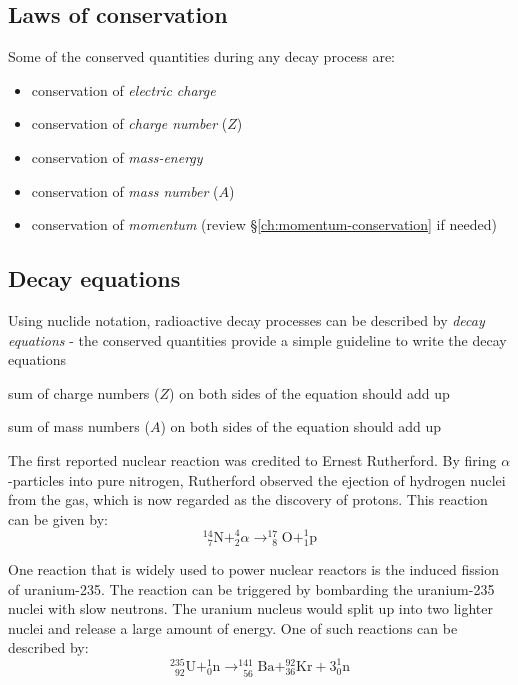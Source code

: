 \documentclass[a4paper,12pt]{book}
\begin{document}
\subsection{Laws of conservation}

Some of the conserved quantities during any decay process are:
\begin{itemize}
    \item conservation of \emph{electric charge}
    \item conservation of \emph{charge number} ($Z$)
    \item conservation of \emph{mass-energy}
    \item conservation of \emph{mass number} ($A$)
    \item conservation of \emph{momentum} (review \S\ref{ch:momentum-conservation} if needed)
\end{itemize}

\subsection{Decay equations}

Using nuclide notation, radioactive decay processes can be described by \emph{decay equations} - the conserved quantities provide a simple guideline to write the decay equations 

\begin{compactenum}
	\item[--] sum of charge numbers ($Z$) on both sides of the equation should add up
	
	\item[--] sum of mass numbers ($A$) on both sides of the equation should add up
\end{compactenum}

The first reported nuclear reaction was credited to Ernest Rutherford. By firing $\alpha$-particles into pure nitrogen, Rutherford observed the ejection of hydrogen nuclei from the gas, which is now regarded as the discovery of protons. This reaction can be given by:
\begin{equation*}
_{\phantom{0}7}^{14} \text{N} + _2^4 \alpha \longrightarrow _{\phantom{0}8}^{17} \text{O} + _{1}^{1} \text{p} 
\end{equation*} 

One reaction that is widely used to power nuclear reactors is the induced fission of uranium-235. The reaction can be triggered by bombarding the uranium-235 nuclei with slow neutrons. The uranium nucleus would split up into two lighter nuclei and release a large amount of energy. One of such reactions can be described by:
\begin{equation*}
 _{\phantom{0}92}^{235} \text{U} + _0^1 \text{n} \longrightarrow _{\phantom{0}56}^{141} \text{Ba} + _{36}^{92} \text{Kr} + 3_0^1 \text{n} 
\end{equation*} 
\end{document}
